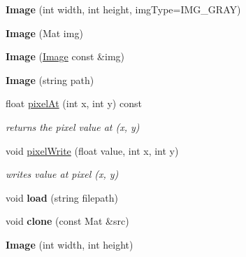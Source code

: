 \begin{DoxyCompactItemize}
\item 
\hypertarget{class_image_a03b42c8c67f24139f3dc540678919cd3}{{\bfseries Image} (int width, int height, img\-Type=I\-M\-G\-\_\-\-G\-R\-A\-Y)}\label{class_image_a03b42c8c67f24139f3dc540678919cd3}

\item 
\hypertarget{class_image_a583efff0899692314aa5a37fda3ec89e}{{\bfseries Image} (Mat img)}\label{class_image_a583efff0899692314aa5a37fda3ec89e}

\item 
\hypertarget{class_image_a11c4da10d93cb19f684f5dbec08e564d}{{\bfseries Image} (\hyperlink{class_image}{Image} const \&img)}\label{class_image_a11c4da10d93cb19f684f5dbec08e564d}

\item 
\hypertarget{class_image_ab5a8cd26aa2d32873ab871eef30bedf3}{{\bfseries Image} (string path)}\label{class_image_ab5a8cd26aa2d32873ab871eef30bedf3}

\item 
\hypertarget{class_image_a9b183ad498d8ffea3f91a21e5a67920d}{float \hyperlink{class_image_a9b183ad498d8ffea3f91a21e5a67920d}{pixel\-At} (int x, int y) const }\label{class_image_a9b183ad498d8ffea3f91a21e5a67920d}

\begin{DoxyCompactList}\small\item\em returns the pixel value at (x, y) \end{DoxyCompactList}\item 
\hypertarget{class_image_afcd6f049060759d996f08b335ef2351d}{void \hyperlink{class_image_afcd6f049060759d996f08b335ef2351d}{pixel\-Write} (float value, int x, int y)}\label{class_image_afcd6f049060759d996f08b335ef2351d}

\begin{DoxyCompactList}\small\item\em writes value at pixel (x, y) \end{DoxyCompactList}\item 
\hypertarget{class_image_a0fde38150064d8658110ac3033f24617}{void {\bfseries load} (string filepath)}\label{class_image_a0fde38150064d8658110ac3033f24617}

\item 
\hypertarget{class_image_a6aa3df4b3f0664a83e3b77587c1b5d70}{void {\bfseries clone} (const Mat \&src)}\label{class_image_a6aa3df4b3f0664a83e3b77587c1b5d70}

\item 
\hypertarget{class_image_afb0339b802ed560e69eb07358d30198f}{{\bfseries Image} (int width, int height)}\label{class_image_afb0339b802ed560e69eb07358d30198f}


\end{DoxyCompactItemize}
